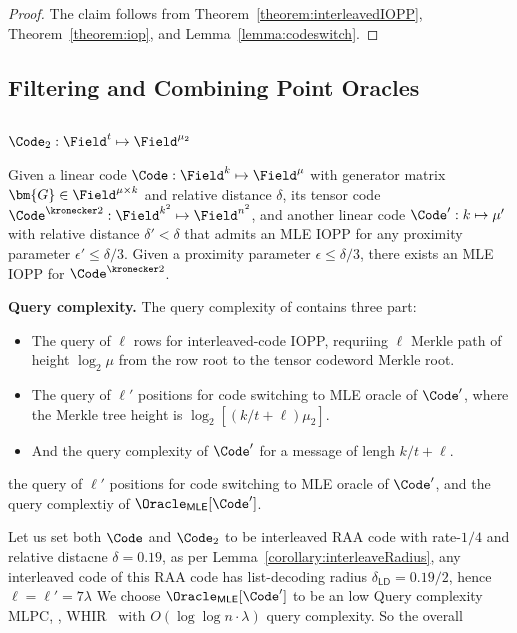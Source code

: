 \begin{proof}
The claim follows from
Theorem~\ref{theorem:interleavedIOPP},
Theorem~\ref{theorem:iop},
and Lemma~\ref{lemma:codeswitch}.
\end{proof}




\subsection{Filtering and Combining Point Oracles}

\subsection{\tensorswitchplus}
\label{sec:tensorswitch}
$\Code_2: \Field^t \mapsto \Field^{\mu_2}$


\begin{theorem}
\label{theorem:tensorSwitch}
Given a linear code $\Code: \Field^k \mapsto \Field^\mu$ with generator matrix $\bm{G} \in \Field^{\mu\times k}$ and relative distance $\delta$, its tensor code $\Code^{\kronecker 2}: \Field^{k^2} \mapsto \Field^{n^2}$,
and another linear code $\Code': k \mapsto \mu'$ with relative distance $\delta'< \delta$ that admits an MLE IOPP for any proximity parameter $\epsilon' \le \delta/3$.
Given a proximity parameter $\epsilon \le \delta/3$,
there exists an MLE IOPP for $\Code^{\kronecker 2}$.
\end{theorem}

\medskip
\noindent
{\bf Query complexity.}
The query complexity of \tensorswitchplus contains three part:
\begin{itemize}
    \item The query of $\ell$ rows for interleaved-code IOPP, requriing $\ell$ Merkle path of height $\log_2 \mu$ from the row root to the tensor codeword Merkle root.
    \item The query of $\ell'$ positions for code switching to MLE oracle of $\Code'$, where the Merkle tree height is
    $\log_2 [(k/t+\ell)\mu_2]$.
    \item And the query complexity of $\Code'$ for a message of lengh ${k/t+\ell}$.
\end{itemize}

the query of $\ell'$ positions for code switching to MLE oracle of $\Code'$,
and the query complextiy of $\Oracle_\mathsf{MLE}[\Code']$.

Let us set both $\Code$ and $\Code_2$ to be interleaved RAA code with rate-$1/4$ and relative distacne $\delta = 0.19$,
as per Lemma~\ref{corollary:interleaveRadius},
any interleaved code of this RAA code has list-decoding radius $\delta_\mathsf{LD} = 0.19/2$,
hence $\ell = \ell' = 7\lambda$
We choose $\Oracle_\mathsf{MLE}[\Code']$ to be an low Query complexity MLPC,
\eg, WHIR~\cite{eurocrypt/ArnonCFY25} with $O(\log\log n \cdot \lambda)$ query complexity.
So the overall 

